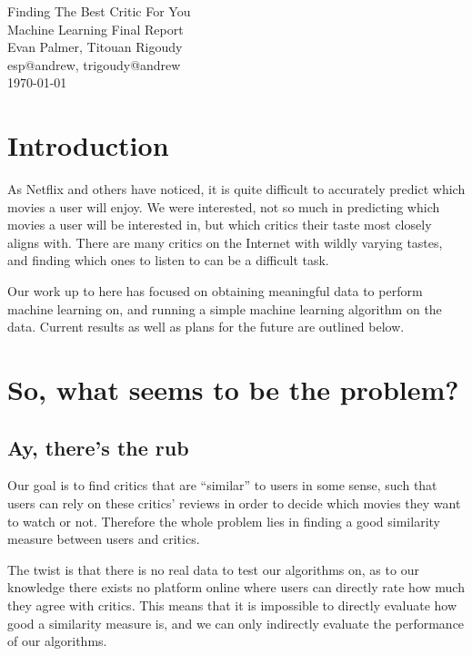 \documentclass[12pt]{article}
\makeatletter
\newcommand{\myname}{Evan Palmer, Titouan Rigoudy}
\newcommand{\myandrew}{esp@andrew, trigoudy@andrew}
\newcommand{\thedate}{\today}
\makeatother
\begin{document}
	\medskip    
	\thispagestyle{plain}
	\begin{center}                 
	{\LARGE Finding The Best Critic For You} \\
	\medskip
	Machine Learning Final Report \\
	\smallskip
	\myname \\
	\myandrew \\
	\thedate \\
	\end{center}
	\vspace{0.5cm}

\section{Introduction}

As Netflix and others have noticed, it is quite difficult to accurately predict which movies a user will enjoy. We were interested, not so much in predicting which movies a user will be interested in, but which critics their taste most closely aligns with. There are many critics on the Internet with wildly varying tastes, and finding which ones to listen to can be a difficult task.

Our work up to here has focused on obtaining meaningful data to perform machine learning on, and running a simple machine learning algorithm on the data. Current results as well as plans for the future are outlined below.

\section{So, what seems to be the problem?}

\subsection{Ay, there's the rub}

Our goal is to find critics that are ``similar'' to users in some sense, such
that users can rely on these critics' reviews in order to decide which movies
they want to watch or not. Therefore the whole problem lies in finding a good
similarity measure between users and critics.

The twist is that there is no real data to test our algorithms on, as to our
knowledge there exists no platform online where users can directly rate how
much they agree with critics. This means that it is impossible to directly
evaluate how good a similarity measure is, and we can only indirectly evaluate
the performance of our algorithms.
\end{document}
